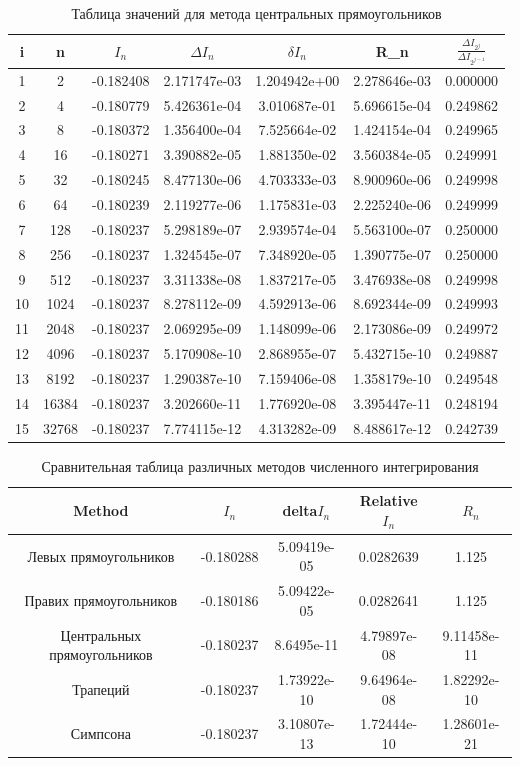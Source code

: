 \documentclass{article}
\begin{document}
 \begin{table}[H]
\centering
\begin{tabular}{|c|c|c|c|c|c|c|}
\hline
i & n & $I_n$ & $\Delta I_n$ & $\delta I_n$ & R_n & $\frac{\Delta I_{2^j}}{\Delta I_{2^{j - 1}}}$ \\
\hline
1 & 2 & -0.182408 & 2.171747e-03  & 1.204942e+00 & 2.278646e-03 & 0.000000 \\
2 & 4 & -0.180779 & 5.426361e-04 & 3.010687e-01 & 5.696615e-04 & 0.249862 \\
3 & 8 & -0.180372 & 1.356400e-04  & 7.525664e-02 & 1.424154e-04 & 0.249965 \\
4 & 16 & -0.180271 & 3.390882e-05  & 1.881350e-02 & 3.560384e-05 & 0.249991 \\
5 & 32 & -0.180245 & 8.477130e-06  & 4.703333e-03 & 8.900960e-06 & 0.249998 \\
6 & 64 & -0.180239 & 2.119277e-06  & 1.175831e-03 & 2.225240e-06 & 0.249999 \\
7 & 128 & -0.180237 & 5.298189e-07  & 2.939574e-04 & 5.563100e-07 & 0.250000 \\
8 & 256 & -0.180237 & 1.324545e-07 & 7.348920e-05 & 1.390775e-07 & 0.250000 \\
9 & 512 & -0.180237 & 3.311338e-08 & 1.837217e-05 & 3.476938e-08 & 0.249998 \\
10 & 1024 & -0.180237 & 8.278112e-09  & 4.592913e-06 & 8.692344e-09 & 0.249993 \\
11 & 2048 & -0.180237 & 2.069295e-09  & 1.148099e-06 & 2.173086e-09 & 0.249972 \\
12 & 4096 & -0.180237 & 5.170908e-10  & 2.868955e-07 & 5.432715e-10 & 0.249887 \\
13 & 8192 & -0.180237 & 1.290387e-10 & 7.159406e-08 & 1.358179e-10 & 0.249548 \\
14 & 16384 & -0.180237 & 3.202660e-11  & 1.776920e-08 & 3.395447e-11 & 0.248194 \\
15 & 32768 & -0.180237 & 7.774115e-12 & 4.313282e-09 & 8.488617e-12 & 0.242739 \\
\hline
\end{tabular}
\caption{Таблица значений для метода центральных прямоугольников}
\label{tab:my_label}
\end{table}


\begin{table}[H]
\centering
\begin{tabular}{|c|c|c|c|c|}
\hline
Method & $I_n$ & delta$I_n$ & Relative$I_n$ & $R_n$ \\
\hline
Левых
прямоугольников& -0.180288 & 5.09419e-05 & 0.0282639 & 1.125 \\
Правих
прямоугольников & -0.180186 & 5.09422e-05 & 0.0282641 & 1.125 \\
Центральных
прямоугольников & -0.180237 & 8.6495e-11 & 4.79897e-08 & 9.11458e-11 \\
Трапеций  & -0.180237 & 1.73922e-10 & 9.64964e-08 & 1.82292e-10 \\
Симпсона  & -0.180237 & 3.10807e-13 & 1.72444e-10 & 1.28601e-21 \\
\hline
\end{tabular}
\caption{Сравнительная таблица различных методов численного интегрирования}
\label{tab:my_label_2}
\end{table}
\end{document}
